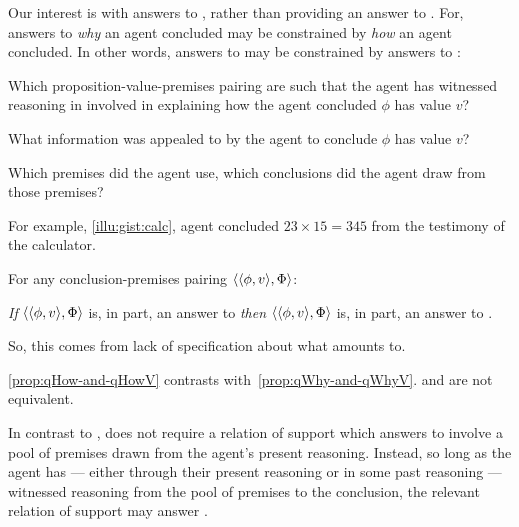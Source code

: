 \begin{note}
  Our interest is with answers to \qWhy{}, rather than providing an answer to \qWhy{}.
  For, answers to \emph{why} an agent concluded may be constrained by \emph{how} an agent concluded.
  In other words, answers to \qWhy{} may be constrained by answers to \qHow{}:

  \begin{question}[\qHowV{}]
    \label{q:how:v}
    Which proposition-value-premises pairing are such that the agent has witnessed reasoning in involved in explaining how the agent concluded \(\phi\) has value \(v\)?
  \end{question}

  What information was appealed to by the agent to conclude \(\phi\) has value \(v\)?

  Which premises did the agent use, which conclusions did the agent draw from those premises?

  For example, \autoref{illu:gist:calc}, agent concluded \(23 \times 15 = 345\) from the testimony of the calculator.
\end{note}

\begin{note}
  \begin{proposition}
    \label{prop:qHow-and-qHowV}
    For any conclusion-premises pairing \(\langle \langle \phi, v \rangle, \Phi \rangle\):

    \emph{If} \(\langle \langle \phi, v \rangle, \Phi \rangle\) is, in part, an answer to \qHow{} \emph{then} \(\langle \langle \phi, v \rangle, \Phi \rangle\) is, in part, an answer to \qHowV{}.
  \end{proposition}

  \begin{argument}
    So, this comes from lack of specification about what \qHow{} amounts to.
  \end{argument}

  \autoref{prop:qHow-and-qHowV} contrasts with~\autoref{prop:qWhy-and-qWhyV}.
  \qHowV{} and \qHow{} are not equivalent.
\end{note}

\begin{note}
    In contrast to \issueInclusion{}, \issueConstraint{} does not require a relation of support which answers \qWhy{} to involve a pool of premises drawn from the agent's present reasoning.
  Instead, so long as the agent has --- either through their present reasoning or in some past reasoning --- witnessed reasoning from the pool of premises to the conclusion, the relevant relation of support may answer \qWhy{}.
\end{note}

